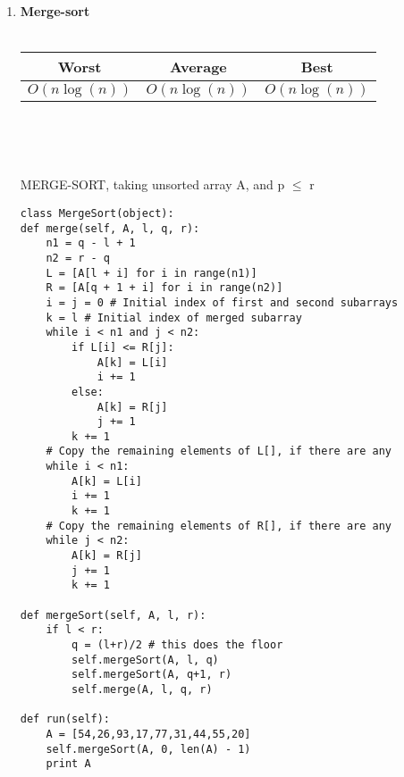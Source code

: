 \documentclass[11pt]{article}
\begin{document}
\begin{enumerate}
    \item \textbf{Merge-sort} \\\\
    \begin{tabular}{c|c|c}
        Worst & Average & Best \\
        \hline
        $O(n\log(n))$ & $O(n\log(n))$ & $O(n\log(n))$
    \end{tabular}
    \\
    \begin{algorithm}[H]
        \Indm{} \\
        \Indp
        \caption{MERGE-SORT, taking unsorted array A, and p $\leq$ r}
    \end{algorithm}
    \begin{verbatim}
class MergeSort(object):
def merge(self, A, l, q, r):
    n1 = q - l + 1
    n2 = r - q
    L = [A[l + i] for i in range(n1)]
    R = [A[q + 1 + i] for i in range(n2)]
    i = j = 0 # Initial index of first and second subarrays
    k = l # Initial index of merged subarray
    while i < n1 and j < n2:
        if L[i] <= R[j]:
            A[k] = L[i]
            i += 1
        else:
            A[k] = R[j]
            j += 1
        k += 1
    # Copy the remaining elements of L[], if there are any
    while i < n1:
        A[k] = L[i]
        i += 1
        k += 1
    # Copy the remaining elements of R[], if there are any
    while j < n2:
        A[k] = R[j]
        j += 1
        k += 1

def mergeSort(self, A, l, r):
    if l < r:
        q = (l+r)/2 # this does the floor
        self.mergeSort(A, l, q)
        self.mergeSort(A, q+1, r)
        self.merge(A, l, q, r)
        
def run(self):
    A = [54,26,93,17,77,31,44,55,20]
    self.mergeSort(A, 0, len(A) - 1)
    print A
    \end{verbatim}
    

\end{enumerate}
\end{document}
